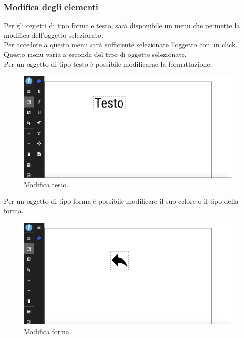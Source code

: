 \subsubsection{Modifica degli elementi}
Per gli oggetti di tipo forma e testo, sarà disponibile un menu che permette la modifica dell'oggetto selezionato.\\
Per accedere a questo menu sarà sufficiente selezionare l'oggetto con un click.\\
Questo menu varia a seconda del tipo di oggetto selezionato.\\
Per un oggetto di tipo testo è possibile modificarne la formattazione:
\begin{figure}[!h]
\begin{center}
\includegraphics[scale=0.35]{img/edit_text.png}
\caption{Modifica testo.}
\end{center}
\end{figure}
\newpage
Per un oggetto di tipo forma è possibile modificare il suo colore o il tipo della forma.\\
\begin{figure}[!h]
\begin{center}
\includegraphics[scale=0.35]{img/edit_shape.png}
\caption{Modifica forma.}
\end{center}
\end{figure}

